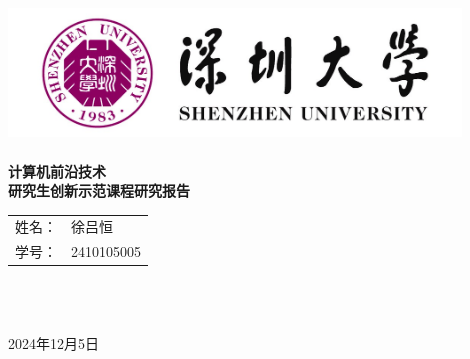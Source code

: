 \begin{titlepage}
	\newcommand{\ID}{{\Large 000000000}}
	\newcommand{\supervisor}{{\Large XXX}}
    
	\center
	\quad\\[1cm]
	\includegraphics[width=12cm]{Content/logo.jpg}\\[1.5cm]
	\quad\\[1cm]
	\makeatletter
	{\linespread{4}\Huge\bfseries 计算机前沿技术}\\[1cm]
{\linespread{4}\Huge\bfseries 研究生创新示范课程研究报告}\\[2cm]
	\begin{table}[H]
		\centering
		  \begin{tabular}{rl}
			{\Large 姓名：}&{\Large 徐吕恒}\\[1cm]
			{\Large 学号：}&{\Large 2410105005}\\[1cm]
		  \end{tabular}\\
	\end{table}
	\makeatother
	\quad\\[1cm]
	{\Large 2024年12月5日}\\[2cm] %
	\vfill 
\end{titlepage}